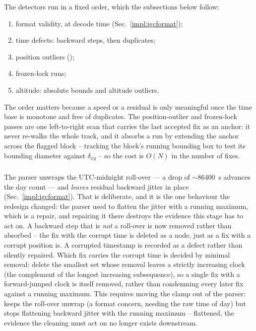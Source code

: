 The detectors run in a fixed order, which the subsections below follow:
\begin{enumerate}[label=(\arabic*), itemsep=0pt, topsep=3pt]
  \item format validity, at decode time (Sec.~\ref{impl:igcformat});
  \item time defects: backward steps, then duplicates;
  \item position outliers ();
  \item frozen-lock runs;
  \item altitude: absolute bounds and altitude outliers.
\end{enumerate}
The order matters because a speed or a residual is only meaningful once the time base is
monotone and free of duplicates.  The position-outlier and frozen-lock passes are one
left-to-right scan that carries the last accepted fix as an anchor: it never re-walks the
whole track, and it absorbs a run by extending the anchor across the flagged block --
tracking the block's running bounding box to test its bounding diameter against $\delta_{xy}$ -- so
the cost is $O(N)$ in the number of fixes.

\subsubsection{}
The parser unwraps the UTC-midnight roll-over --- a drop of
$\sim$\SI{86400}{\second} advances the day count --- and \emph{leaves} residual backward
jitter in place (Sec.~\ref{impl:igcformat}). That is deliberate, and it is the one behaviour
the redesign changed: the parser used to flatten the jitter with a running maximum, which is
a repair, and repairing it there destroys the evidence this stage has to act on. A backward
step that is \emph{not} a roll-over is now removed rather than absorbed -- the fix with the corrupt
time is deleted as a node, just as a fix with a corrupt position is. A corrupted timestamp
is recorded as a defect rather than silently repaired. Which fix carries the corrupt time
is decided by minimal removal: delete the smallest set whose removal leaves a strictly
increasing clock (the complement of the longest increasing subsequence), so a single fix
with a forward-jumped clock is itself removed, rather than condemning every later fix
against a running maximum. This requires moving the clamp out of the parser:
 keeps the roll-over unwrap (a format concern, needing the raw time of day)
but stops flattening backward jitter with the running maximum -- flattened, the evidence the
cleaning must act on no longer exists downstream.

